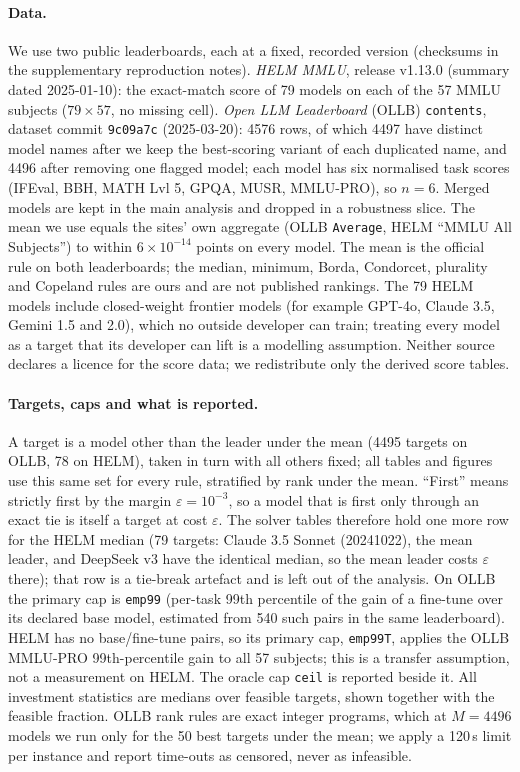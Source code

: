 \documentclass{article}
\begin{document}
\paragraph{Data.}
We use two public leaderboards, each at a fixed, recorded version (checksums in the supplementary reproduction notes). \emph{HELM MMLU}, release v1.13.0 (summary dated 2025-01-10): the exact-match score of 79 models on each of the 57 MMLU subjects ($79\times57$, no missing cell). \emph{Open LLM Leaderboard} (OLLB) \texttt{contents}, dataset commit \texttt{9c09a7c} (2025-03-20): 4576 rows, of which 4497 have distinct model names after we keep the best-scoring variant of each duplicated name, and 4496 after removing one flagged model; each model has six normalised task scores (IFEval, BBH, MATH Lvl 5, GPQA, MUSR, MMLU-PRO), so $n=6$. Merged models are kept in the main analysis and dropped in a robustness slice. The mean we use equals the sites' own aggregate (OLLB \texttt{Average}, HELM ``MMLU All Subjects'') to within $6\times10^{-14}$ points on every model. The mean is the official rule on both leaderboards; the median, minimum, Borda, Condorcet, plurality and Copeland rules are ours and are not published rankings. The 79 HELM models include closed-weight frontier models (for example GPT-4o, Claude 3.5, Gemini 1.5 and 2.0), which no outside developer can train; treating every model as a target that its developer can lift is a modelling assumption. Neither source declares a licence for the score data; we redistribute only the derived score tables.

\paragraph{Targets, caps and what is reported.}
A target is a model other than the leader under the mean (4495 targets on OLLB, 78 on HELM), taken in turn with all others fixed; all tables and figures use this same set for every rule, stratified by rank under the mean. ``First'' means strictly first by the margin $\varepsilon=10^{-3}$, so a model that is first only through an exact tie is itself a target at cost $\varepsilon$. The solver tables therefore hold one more row for the HELM median (79 targets: Claude 3.5 Sonnet (20241022), the mean leader, and DeepSeek v3 have the identical median, so the mean leader costs $\varepsilon$ there); that row is a tie-break artefact and is left out of the analysis. On OLLB the primary cap is \texttt{emp99} (per-task 99th percentile of the gain of a fine-tune over its declared base model, estimated from 540 such pairs in the same leaderboard). HELM has no base/fine-tune pairs, so its primary cap, \texttt{emp99T}, applies the OLLB MMLU-PRO 99th-percentile gain to all 57 subjects; this is a transfer assumption, not a measurement on HELM. The oracle cap \texttt{ceil} is reported beside it. All investment statistics are medians over feasible targets, shown together with the feasible fraction. OLLB rank rules are exact integer programs, which at $M=4496$ models we run only for the 50 best targets under the mean; we apply a 120\,s limit per instance and report time-outs as censored, never as infeasible.
\end{document}
